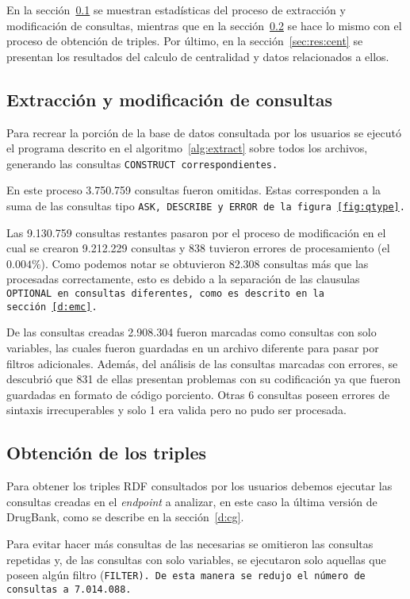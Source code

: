 En la sección~\ref{sec:res:extr} se muestran estadísticas del proceso de
extracción y modificación de consultas, mientras que en la
sección~\ref{sec:res:obt} se hace lo mismo con el proceso de obtención de
triples.
Por último, en la sección~\ref{sec:res:cent} se presentan los resultados del
calculo de centralidad y datos relacionados a ellos.

\subsection{Extracción y modificación de consultas}\label{sec:res:extr}
Para recrear la porción de la base de datos consultada por los usuarios se
ejecutó el programa descrito en el algoritmo~\ref{alg:extract} sobre todos los
archivos, generando las consultas \tt{CONSTRUCT} correspondientes.

En este proceso 3.750.759 consultas fueron omitidas. Estas corresponden a la
suma de las consultas tipo \tt{ASK}, \tt{DESCRIBE} y \tt{ERROR} de la
figura~\ref{fig:qtype}.

Las 9.130.759 consultas restantes pasaron por el proceso de modificación en el
cual se crearon 9.212.229 consultas y 838 tuvieron errores de procesamiento
(el $0.004\%$).
Como podemos notar se obtuvieron 82.308 consultas más que las procesadas
correctamente, esto es debido a la separación de las clausulas \tt{OPTIONAL} en
consultas diferentes, como es descrito en la sección~\ref{d:emc}.

De las consultas creadas 2.908.304 fueron marcadas como consultas con solo
variables, las cuales fueron guardadas en un archivo diferente para pasar por
filtros adicionales. 
Además, del análisis de las consultas marcadas con errores, se descubrió que
831 de ellas presentan problemas con su codificación ya que fueron guardadas en
formato de código porciento. Otras 6 consultas poseen errores de sintaxis
irrecuperables y solo 1 era valida pero no pudo ser procesada.

\subsection{Obtención de los triples}\label{sec:res:obt}
Para obtener los triples RDF consultados por los usuarios debemos ejecutar las
consultas creadas en el \emph{endpoint} a analizar, en este caso la última
versión de DrugBank, como se describe en la sección~\ref{d:cg}.

Para evitar hacer más consultas de las necesarias se omitieron las consultas
repetidas y, de las consultas con solo variables, se ejecutaron solo aquellas
que poseen algún filtro (\tt{FILTER}). De esta manera se redujo el número de
consultas a 7.014.088.

